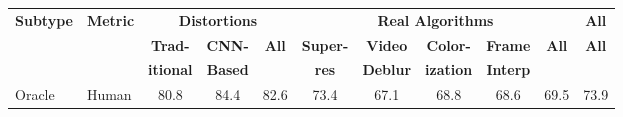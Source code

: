 

\begin{table*}[t]
\begin{center}
\resizebox{\linewidth}{!} {
\begin{tabular}{l l@{\hskip .05in} c@{\hskip .05in} c@{\hskip .05in} c@{\hskip .15in} c@{\hskip .05in} @{\hskip .05in}c@{\hskip .05in} c@{\hskip .05in} c@{\hskip .05in} c@{\hskip .15in} c@{\hskip .05in} } \toprule

\multirow{3}[3]{*}{\textbf{Subtype}} &\multirow{3}[3]{*}{\textbf{Metric}} & \multicolumn{3}{c}{\textbf{Distortions}} & \multicolumn{5}{c}{\textbf{Real Algorithms}} & \multirow{1}{*}{\textbf{All}} \\ \cmidrule(lr){3-5} \cmidrule(lr){6-10} \cmidrule(lr){11-11} 

& & \textbf{Trad-} & \textbf{CNN-} & \multirow{2}{*}{\textbf{All}} & \textbf{Super-} & \textbf{Video} & \textbf{Color-} & \textbf{Frame} & \multirow{2}{*}{\textbf{All}} & \multirow{2}{*}{\textbf{All}} \\
 
& & \textbf{itional} & \textbf{Based} & \textbf{} & \textbf{res} & \textbf{Deblur} & \textbf{ization} & \textbf{Interp} & \\ \midrule

Oracle & Human & 80.8 & 84.4 & 82.6 & 73.4 & 67.1 & 68.8 & 68.6 & 69.5 & 73.9 \\ \midrule


\end{tabular}}
\end{center}
\end{table*}
